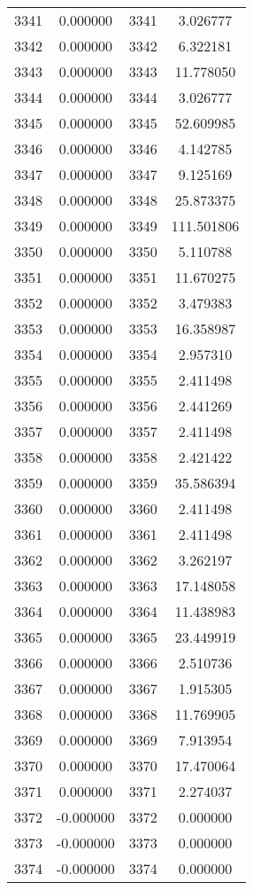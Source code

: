 \documentclass[12pt]{article}
\begin{document}
\begin{longtable}{@{}cccc@{}}
3341 & 0.000000 & 3341 & 3.026777 \\
3342 & 0.000000 & 3342 & 6.322181 \\
3343 & 0.000000 & 3343 & 11.778050 \\
3344 & 0.000000 & 3344 & 3.026777 \\
3345 & 0.000000 & 3345 & 52.609985 \\
3346 & 0.000000 & 3346 & 4.142785 \\
3347 & 0.000000 & 3347 & 9.125169 \\
3348 & 0.000000 & 3348 & 25.873375 \\
3349 & 0.000000 & 3349 & 111.501806 \\
3350 & 0.000000 & 3350 & 5.110788 \\
3351 & 0.000000 & 3351 & 11.670275 \\
3352 & 0.000000 & 3352 & 3.479383 \\
3353 & 0.000000 & 3353 & 16.358987 \\
3354 & 0.000000 & 3354 & 2.957310 \\
3355 & 0.000000 & 3355 & 2.411498 \\
3356 & 0.000000 & 3356 & 2.441269 \\
3357 & 0.000000 & 3357 & 2.411498 \\
3358 & 0.000000 & 3358 & 2.421422 \\
3359 & 0.000000 & 3359 & 35.586394 \\
3360 & 0.000000 & 3360 & 2.411498 \\
3361 & 0.000000 & 3361 & 2.411498 \\
3362 & 0.000000 & 3362 & 3.262197 \\
3363 & 0.000000 & 3363 & 17.148058 \\
3364 & 0.000000 & 3364 & 11.438983 \\
3365 & 0.000000 & 3365 & 23.449919 \\
3366 & 0.000000 & 3366 & 2.510736 \\
3367 & 0.000000 & 3367 & 1.915305 \\
3368 & 0.000000 & 3368 & 11.769905 \\
3369 & 0.000000 & 3369 & 7.913954 \\
3370 & 0.000000 & 3370 & 17.470064 \\
3371 & 0.000000 & 3371 & 2.274037 \\
3372 & -0.000000 & 3372 & 0.000000 \\
3373 & -0.000000 & 3373 & 0.000000 \\
3374 & -0.000000 & 3374 & 0.000000 \\

\end{longtable}
\end{document}
